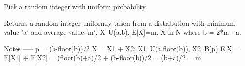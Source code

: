 \begin{DoxyVerb}Pick a random integer with uniform probability.

Returns a random integer uniformly taken from a distribution with
minimum value 'a' and average value 'm', X~U(a,b), E[X]=m, X in N where
b = 2*m - a.

Notes
-----
p = (b-floor(b))/2
X = X1 + X2; X1~U(a,floor(b)), X2~B(p)
E[X] = E[X1] + E[X2] = (floor(b)+a)/2 + (b-floor(b))/2 = (b+a)/2 = m
\end{DoxyVerb}
 